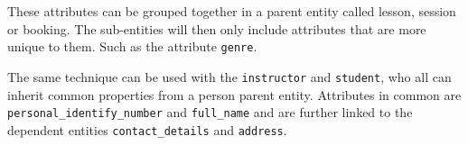 \documentclass[a4paper]{scrartcl}
\begin{document}
These attributes can be grouped together
in a parent entity called lesson, session or booking. 
The sub-entities will then only include attributes that are more
unique to them. 
Such as the attribute
\verb|genre|.

The same technique can be used with the 
\verb|instructor| and 
\verb|student|,
who all can inherit common properties from a 
person 
parent entity. 
Attributes in common are 
\verb|personal_identify_number| and 
\verb|full_name| 
and are further linked to the dependent entities 
\verb|contact_details|
and 
\verb|address|.







\end{document}
